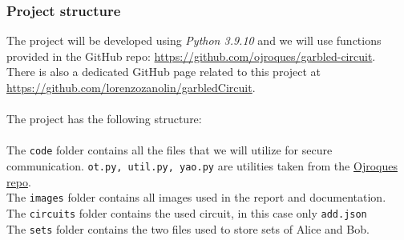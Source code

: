 \documentclass[12pt]{article}
\newcommand{\inlinecode}{\texttt}
\begin{document}
\subsubsection{Project structure}
The project will be developed using \textit{Python 3.9.10} and we will use functions provided in the GitHub repo: \url{https://github.com/ojroques/garbled-circuit}\label{ref:git}.\\
There is also a dedicated GitHub page related to this project at \url{https://github.com/lorenzozanolin/garbledCircuit}\label{zanoGit}.\\ \\ The project has the following structure:\\ \\
The \inlinecode{code} folder contains all the files that we will utilize for secure communication. \inlinecode{ot.py, util.py, yao.py} are utilities taken from the \hyperref[ref:git]{Ojroques repo}.\\
The \inlinecode{images} folder contains all images used in the report and documentation.\\
The \inlinecode{circuits} folder contains the used circuit, in this case only \inlinecode{add.json}\\
The \inlinecode{sets} folder contains the two files used to store sets of Alice and Bob.\\ \\
\\ \\
\end{document}
